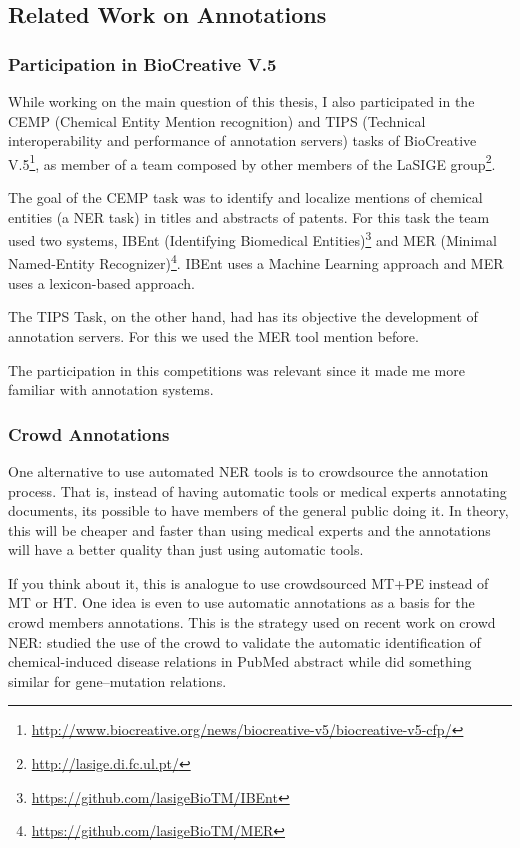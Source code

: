 \subsection{Related Work on Annotations}

\subsubsection{Participation in BioCreative V.5}
\label{biocreative}

While working on the main question of this thesis, I also participated in the CEMP (Chemical Entity Mention recognition) and TIPS (Technical interoperability and performance of annotation servers) tasks of BioCreative V.5\footnote{\url{http://www.biocreative.org/news/biocreative-v5/biocreative-v5-cfp/}}, as member of a team composed by other members of the LaSIGE group\footnote{\url{http://lasige.di.fc.ul.pt/}}.

The goal of the CEMP task was to identify and localize mentions of chemical entities (a NER task) in titles and abstracts of patents. For this task the team used two systems, IBEnt (Identifying Biomedical Entities)\footnote{\url{https://github.com/lasigeBioTM/IBEnt}} and MER (Minimal Named-Entity Recognizer)\footnote{\url{https://github.com/lasigeBioTM/MER}}. IBEnt uses a Machine Learning approach and MER uses a lexicon-based approach. 

The TIPS Task, on the other hand, had has its objective the development of annotation servers. For this we used the MER tool mention before. 


The participation in this competitions was relevant since it made me more familiar with annotation systems.

\subsubsection{Crowd Annotations}

One alternative to use automated NER tools is to crowdsource the annotation process. That is, instead of having automatic tools or medical experts annotating documents, its possible to have members of the general public doing it. In theory, this will be cheaper and faster than using medical experts and the annotations will have a better quality than just using automatic tools.

If you think about it, this is analogue to use crowdsourced MT+PE instead of MT or HT. One idea is even to use automatic annotations as a basis for the crowd members annotations. This is the strategy used on recent work on crowd NER: \citep{Li2016} studied the use of the crowd to validate the automatic identification of chemical-induced disease relations in PubMed abstract while \citep{Burger2014} did something similar for gene–mutation relations.

